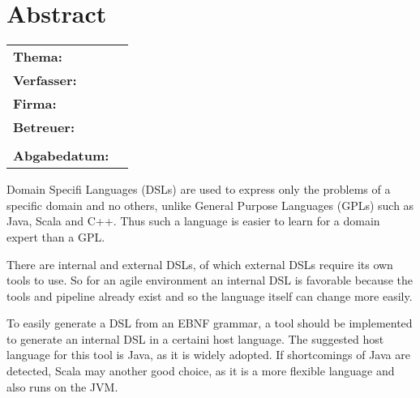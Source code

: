 \documentclass[../find-a-part.tex]{subfiles}
\begin{document}
\chapter*{Abstract}

\begin{center}
	\begin{tabular}{ll}
		\textbf{Thema:} 		& \topic\\
		\textbf{Verfasser:} 	& \authorName\\
		\textbf{Firma:} 		& \companyName\\
		\textbf{Betreuer:}		& \proffessor\\
								& \carer\\
		\textbf{Abgabedatum:}	& \closingdate\\
	\end{tabular}
\end{center}

\bigskip
Domain Specifi Languages (DSLs) are used to express only the problems of a specific domain and no others, unlike General Purpose Languages (GPLs) such as Java, Scala and C++. Thus such a language is easier to learn for a domain expert than a GPL.

There are internal and external DSLs, of which external DSLs require its own tools to use. So for an agile environment an internal DSL is favorable because the tools and pipeline already exist and so the language itself can change more easily.

To easily generate a DSL from an EBNF grammar, a tool should be implemented to generate an internal DSL in a certaini host language. The suggested host language for this tool is Java, as it is widely adopted. If shortcomings of Java are detected, Scala may another good choice, as it is a more flexible language and also runs on the JVM.
\newpage
\end{document}

